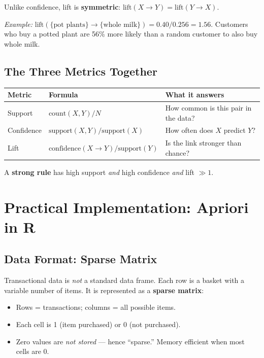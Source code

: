 \documentclass[11pt]{article}
\begin{document}
Unlike confidence, lift is \textbf{symmetric}: $\text{lift}(X \to Y) =
\text{lift}(Y \to X)$.

\textit{Example:} $\text{lift}(\{\text{pot plants}\} \to \{\text{whole milk}\})
= 0.40 / 0.256 = 1.56$. Customers who buy a potted plant are 56\% more likely
than a random customer to also buy whole milk.

\subsection{The Three Metrics Together}
\begin{center}
\begin{tabular}{@{}p{2cm}p{4.5cm}p{5.5cm}@{}}
\toprule
\textbf{Metric} & \textbf{Formula} & \textbf{What it answers} \\
\midrule
Support & $\text{count}(X,Y)/N$ & How common is this pair in the data? \\
Confidence & $\text{support}(X,Y)/\text{support}(X)$ & How often does $X$ predict $Y$? \\
Lift & $\text{confidence}(X \to Y)/\text{support}(Y)$ & Is the link stronger than chance? \\
\bottomrule
\end{tabular}
\end{center}

A \textbf{strong rule} has high support \emph{and} high confidence \emph{and}
lift $\gg 1$.


\section{Practical Implementation: Apriori in R}

\subsection{Data Format: Sparse Matrix}
Transactional data is \emph{not} a standard data frame. Each row is a
basket with a variable number of items. It is represented as a
\textbf{sparse matrix}:
\begin{itemize}
    \item Rows = transactions; columns = all possible items.
    \item Each cell is 1 (item purchased) or 0 (not purchased).
    \item Zero values are \emph{not stored} --- hence ``sparse.'' Memory
      efficient when most cells are 0.
\end{itemize}
\end{document}
